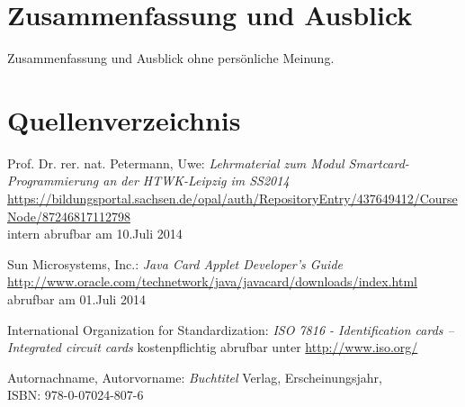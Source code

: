 \documentclass[a4paper,12pt]{scrartcl}
\begin{document}
\clearpage
\section{Zusammenfassung und Ausblick}
\label{sec:5}
Zusammenfassung und Ausblick ohne persönliche Meinung.

\clearpage
\section{Quellenverzeichnis}
\label{sec:6}
\renewcommand\refname{Quellenverzeichnis}
\begin{thebibliography}{999}

Prof. Dr. rer. nat. Petermann, Uwe: {\sl   Lehrmaterial zum Modul Smartcard-Programmierung an der  HTWK-Leipzig im SS2014}\\
\url{https://bildungsportal.sachsen.de/opal/auth/RepositoryEntry/437649412/CourseNode/87246817112798}\\
intern abrufbar am 10.Juli 2014

Sun Microsystems, Inc.:  {\sl Java Card Applet Developer's Guide}\\
\url{http://www.oracle.com/technetwork/java/javacard/downloads/index.html}\\
abrufbar am 01.Juli 2014

International Organization for Standardization: {\sl ISO 7816 - Identification cards -- Integrated circuit cards}
kostenpflichtig abrufbar unter \url{http://www.iso.org/}

Autornachname, Autorvorname:  {\sl Buchtitel} Verlag, Erscheinungsjahr,
\\ISBN:  978-0-07024-807-6




\end{thebibliography}
\end{document}
